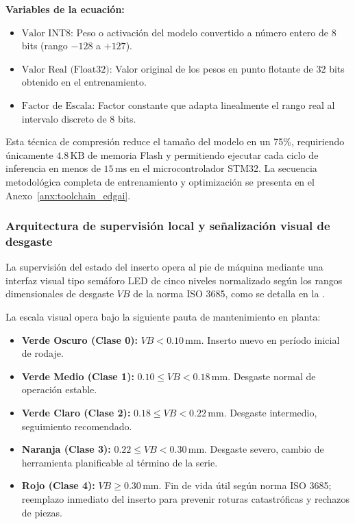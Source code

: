 \noindent\textbf{Variables de la ecuación:}
\begin{itemize}
    \item $\text{Valor INT8}$: Peso o activación del modelo convertido a número entero de 8 bits (rango $-128$ a $+127$).
    \item $\text{Valor Real (Float32)}$: Valor original de los pesos en punto flotante de 32 bits obtenido en el entrenamiento.
    \item $\text{Factor de Escala}$: Factor constante que adapta linealmente el rango real al intervalo discreto de 8 bits.
\end{itemize}

Esta técnica de compresión reduce el tamaño del modelo en un 75\%, requiriendo únicamente $4.8\,\text{KB}$ de memoria Flash y permitiendo ejecutar cada ciclo de inferencia en menos de $15\,\text{ms}$ en el microcontrolador STM32. La secuencia metodológica completa de entrenamiento y optimización se presenta en el Anexo~\ref{anx:toolchain_edgai}.

\subsubsection{Arquitectura de supervisión local y señalización visual de desgaste}

La supervisión del estado del inserto opera al pie de máquina mediante una interfaz visual tipo semáforo LED de cinco niveles normalizado según los rangos dimensionales de desgaste $VB$ de la norma ISO 3685, como se detalla en la .


La escala visual opera bajo la siguiente pauta de mantenimiento en planta:
\begin{itemize}
    \item \textbf{Verde Oscuro (Clase 0):} $VB < 0.10\,\text{mm}$. Inserto nuevo en período inicial de rodaje.
    \item \textbf{Verde Medio (Clase 1):} $0.10 \le VB < 0.18\,\text{mm}$. Desgaste normal de operación estable.
    \item \textbf{Verde Claro (Clase 2):} $0.18 \le VB < 0.22\,\text{mm}$. Desgaste intermedio, seguimiento recomendado.
    \item \textbf{Naranja (Clase 3):} $0.22 \le VB < 0.30\,\text{mm}$. Desgaste severo, cambio de herramienta planificable al término de la serie.
    \item \textbf{Rojo (Clase 4):} $VB \ge 0.30\,\text{mm}$. Fin de vida útil según norma ISO 3685; reemplazo inmediato del inserto para prevenir roturas catastróficas y rechazos de piezas.
\end{itemize}


